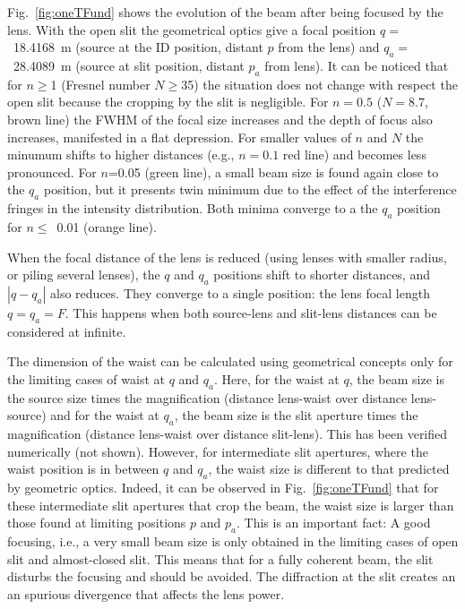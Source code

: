 \documentclass{iucr}              %
\begin{document}
Fig.~\ref{fig:oneTFund} shows the evolution of the beam after being focused by the lens. With the open slit the geometrical optics give a focal position $q=$~\SI{18.4168}{\meter} (source at the ID position, distant $p$ from the lens) and $q_a=$~\SI{28.4089}{\meter} (source at slit position, distant $p_a$ from lens). It can be noticed that for $n\ge$1 (Fresnel number $N\ge$35) the situation does not change with respect the open slit because the cropping by the slit is negligible. For $n=0.5$ ($N=8.7$, brown line) the FWHM of the focal size increases and the depth of focus also increases, manifested in a flat depression. For smaller values of $n$ and $N$ the minumum shifts to higher distances (e.g., $n=0.1$ red line) and becomes less pronounced. For $n$=0.05 (green line), a small beam size is found again close to the $q_a$ position, but it presents twin minimum due to the effect of the interference fringes in the intensity distribution. Both minima converge to a the $q_a$ position for $n\le$~0.01 (orange line). 

When the focal distance of the lens is reduced (using lenses with smaller radius, or piling several lenses), the $q$ and $q_a$ positions shift to shorter distances,
and  $|q-q_a|$ also reduces. They converge to a single position: the lens focal length $q=q_a=F$. This happens when both source-lens and slit-lens distances can be considered at infinite. 

The dimension of the waist can be calculated using geometrical concepts only for the limiting cases of waist at $q$ and $q_a$. Here, for the waist at $q$, the beam size is the source size times the magnification (distance lens-waist over distance lens-source) and for the waist at $q_a$, the beam size is the slit aperture times the magnification (distance lens-waist over distance slit-lens). This has been verified numerically (not shown). However, for intermediate slit apertures, where the waist position is in between $q$ and $q_a$, the waist size is different to that predicted by geometric optics.
Indeed, it can be observed in Fig.~\ref{fig:oneTFund} that for these intermediate slit apertures that crop the beam, the waist size is larger than those found at limiting positions $p$ and $p_a$.
This is an important fact: A good focusing, i.e., a very small beam size is only obtained in the limiting cases of open slit and almost-closed slit. This means that for a fully coherent beam, the slit disturbs the focusing and should be avoided. The diffraction at the slit creates an an spurious divergence that affects the lens power. 
\end{document}

